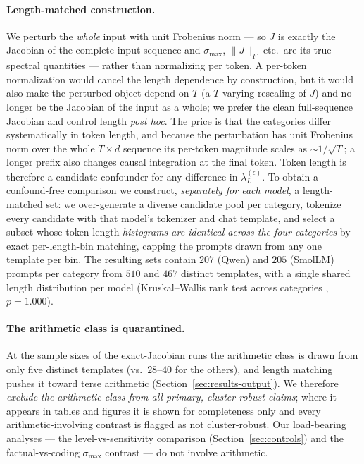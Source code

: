 \documentclass{article}
\begin{document}
\paragraph{Length-matched construction.}
\label{sec:methods-lengthmatch}
We perturb the \emph{whole} input with unit Frobenius norm --- so $J$ is exactly the Jacobian of the
complete input sequence and $\sigma_{\max}$, $\|J\|_F$ etc.\ are its true spectral quantities --- rather
than normalizing per token. A per-token normalization would cancel the length dependence by
construction, but it would also make the perturbed object depend on $T$ (a $T$-varying rescaling of $J$)
and no longer be the Jacobian of the input as a whole; we prefer the clean full-sequence Jacobian and
control length \emph{post hoc}. The price is that the categories differ systematically in token length,
and because the perturbation has unit Frobenius norm over the whole $T\times d$ sequence its per-token
magnitude scales as
$\sim\!1/\sqrt T$; a longer prefix also changes causal integration at the final token. Token
length is therefore a candidate confounder for any difference in $\lambda_L^{(\epsilon)}$. To
obtain a confound-free comparison we construct, \emph{separately for each model}, a length-matched
set: we over-generate a diverse candidate pool per category, tokenize every candidate with that
model's tokenizer and chat template, and select a subset whose token-length \emph{histograms are
identical across the four categories} by exact per-length-bin matching, capping the prompts drawn
from any one template per bin. The resulting sets contain $207$ (Qwen) and $205$ (SmolLM) prompts
per category from $510$ and $467$ distinct templates, with a single shared length distribution
per model (Kruskal--Wallis rank test across categories \cite{kruskal1952use}, $p=1.000$).

\paragraph{The arithmetic class is quarantined.} At the sample sizes of the exact-Jacobian runs the
arithmetic class is drawn from only five distinct templates (vs.\ $28$--$40$ for the others), and
length matching pushes it toward terse arithmetic (Section~\ref{sec:results-output}). We therefore
\emph{exclude the arithmetic class from all primary, cluster-robust claims}; where it appears in
tables and figures it is shown for completeness only and every arithmetic-involving contrast is
flagged as not cluster-robust. Our load-bearing analyses --- the level-vs-sensitivity comparison
(Section~\ref{sec:controls}) and the factual-vs-coding $\sigma_{\max}$ contrast --- do not involve
arithmetic.
\end{document}
